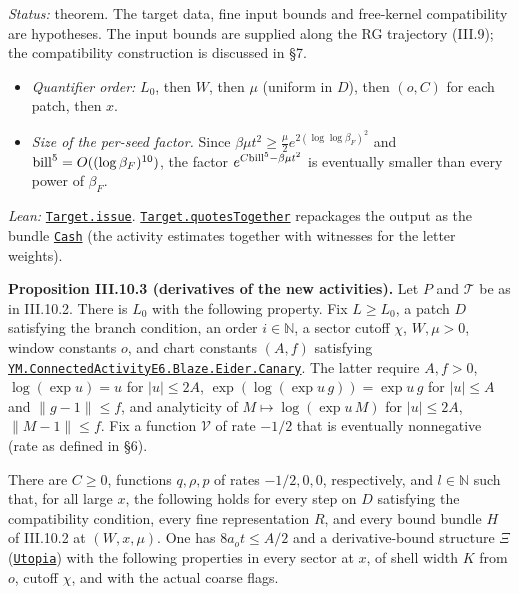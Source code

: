 \documentclass[
  letterpaper,
  11pt]{article}
\providecommand{\tightlist}{%
  \setlength{\itemsep}{0pt}\setlength{\parskip}{0pt}}
\begin{document}
\emph{Status:} theorem. The target data, fine input bounds and
free-kernel compatibility are hypotheses. The input bounds are supplied
along the RG trajectory (III.9); the compatibility construction is
discussed in §7.

\begin{itemize}
\tightlist
\item
  \emph{Quantifier order:} \(L_0\), then \(W\), then \(\mu\) (uniform in
  \(D\)), then \((o,C)\) for each patch, then \(x\).
\item
  \emph{Size of the per-seed factor.} Since
  \(\beta\mu t^2\ge\frac\mu2e^{2(\log\log\beta_F)^2}\) and
  \({\rm bill}^5=O((\log\beta_F)^{10})\), the factor
  \(e^{C{\rm bill}^5-\beta\mu t^2}\) is eventually smaller than every
  power of \(\beta_F\).
\end{itemize}

\emph{Lean:}
\href{https://github.com/yang-mills-group/OpenAI-YM-20261028/blob/3456e5e75cf8d4cd558955a5c7638fba2d68f464/YM/AnalyticNext/CONNECTED_ACTIVITY_JETS_E6/Issue.lean\#L94-L185}{\texttt{Target.issue}}.
\href{https://github.com/yang-mills-group/OpenAI-YM-20261028/blob/3456e5e75cf8d4cd558955a5c7638fba2d68f464/YM/AnalyticNext/CONNECTED_ACTIVITY_JETS_E6/IssuePlan.lean\#L53-L69}{\texttt{Target.quotesTogether}}
repackages the output as the bundle
\href{https://github.com/yang-mills-group/OpenAI-YM-20261028/blob/3456e5e75cf8d4cd558955a5c7638fba2d68f464/YM/AnalyticNext/CONNECTED_ACTIVITY_JETS_E6/Batch.lean\#L82-L97}{\texttt{Cash}}
(the activity estimates together with witnesses for the letter weights).

\textbf{Proposition III.10.3 (derivatives of the new activities).} Let
\(P\) and \(\mathcal T\) be as in III.10.2. There is \(L_0\) with the
following property. Fix \(L\ge L_0\), a patch \(D\) satisfying the
branch condition, an order \(i\in\mathbb N\), a sector cutoff \(\chi\),
\(W,\mu>0\), window constants \(o\), and chart constants \((A,f)\)
satisfying
\href{https://github.com/yang-mills-group/OpenAI-YM-20261028/blob/3456e5e75cf8d4cd558955a5c7638fba2d68f464/YM/AnalyticNext/CONNECTED_ACTIVITY_JETS_E6/Eider.lean\#L32-L37}{\texttt{YM.ConnectedActivityE6.Blaze.Eider.Canary}}.
The latter require \(A,f>0\), \(\log(\exp u)=u\) for \(|u|\le2A\),
\(\exp(\log(\exp u\,g))=\exp u\,g\) for \(|u|\le A\) and
\(\|g-1\|\le f\), and analyticity of \(M\mapsto\log(\exp u\,M)\) for
\(|u|\le2A\), \(\|M-1\|\le f\). Fix a function \(\mathcal V\) of rate
\(-1/2\) that is eventually nonnegative (rate as defined in §6).

There are \(C\ge0\), functions \(q,\rho,p\) of rates \(-1/2,0,0\),
respectively, and \(l\in\mathbb N\) such that, for all large \(x\), the
following holds for every step on \(D\) satisfying the compatibility
condition, every fine representation \(R\), and every bound bundle \(H\)
of III.10.2 at \((W,x,\mu)\). One has \(8a_ot\le A/2\) and a
derivative-bound structure \(\Xi\)
(\href{https://github.com/yang-mills-group/OpenAI-YM-20261028/blob/3456e5e75cf8d4cd558955a5c7638fba2d68f464/YM/AnalyticNext/CONNECTED_ACTIVITY_JETS_E6/Das.lean\#L27-L46}{\texttt{Utopia}})
with the following properties in every sector at \(x\), of shell width
\(K\) from \(o\), cutoff \(\chi\), and with the actual coarse flags.
\end{document}
